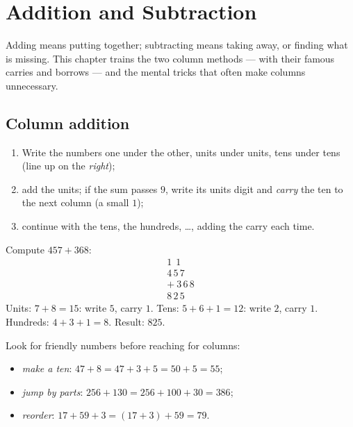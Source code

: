 \chapter{Addition and Subtraction}\label{ch:g3:addsub}

Adding means putting together; subtracting means taking away, or
finding what is missing. This chapter trains the two column methods
--- with their famous carries and borrows --- and the mental tricks
that often make columns unnecessary.

\section{Column addition}

\begin{method}\label{met:g3:addsub:add}
\begin{enumerate}
  \item Write the numbers one under the other, units under units,
        tens under tens (line up on the \emph{right});
  \item add the units; if the sum passes $9$, write its units digit
        and \emph{carry} the ten to the next column (a small $1$);
  \item continue with the tens, the hundreds, \dots, adding the carry
        each time.
\end{enumerate}
\end{method}

\begin{example}\label{ex:g3:addsub:add}
Compute $457 + 368$:
\[
\begin{array}{r}
{\scriptstyle 1}\ \ {\scriptstyle 1}\ \ \phantom{0} \\[-3pt]
4\,5\,7 \\
+\ 3\,6\,8 \\
\hline
8\,2\,5
\end{array}
\]
Units: $7 + 8 = 15$: write $5$, carry $1$. Tens:
$5 + 6 + 1 = 12$: write $2$, carry $1$. Hundreds: $4 + 3 + 1 = 8$.
Result: $825$.
\end{example}

\begin{example}\label{ex:g3:addsub:mental}
Look for friendly numbers before reaching for columns:
\begin{itemize}
  \item \emph{make a ten}: $47 + 8 = 47 + 3 + 5 = 50 + 5 = 55$;
  \item \emph{jump by parts}: $256 + 130 = 256 + 100 + 30 = 386$;
  \item \emph{reorder}: $17 + 59 + 3 = (17 + 3) + 59 = 79$.
\end{itemize}
\end{example}

